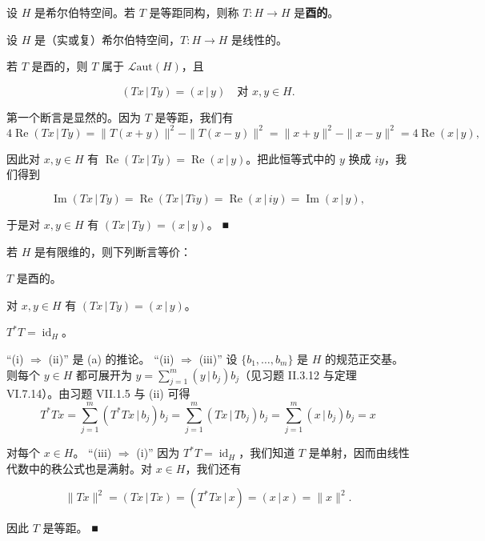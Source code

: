 设 $ H $ 是希尔伯特空间。若 $ T $ 是等距同构，则称 $ T: H \to H $ 是\textbf{酉的}。

\begin{remark}

设 $ H $ 是（实或复）希尔伯特空间，$ T: H \to H $ 是线性的。

\begin{items}
\item

若 $ T $ 是酉的，则 $ T $ 属于 $ \mathcal{L}\mathrm{aut}(H) $，且

\[
(Tx\,|\,Ty) = (x\,|\,y) \quad \text{对 } x, y \in H .
\]

\proofhead
第一个断言是显然的。因为 $ T $ 是等距，我们有
\[
4\operatorname{Re}(Tx\,|\,Ty) = \|T(x+y)\|^2 - \|T(x-y)\|^2 = \|x+y\|^2 - \|x-y\|^2 = 4\operatorname{Re}(x\,|\,y) ,
\]

因此对 $ x, y \in H $ 有 $ \operatorname{Re}(Tx\,|\,Ty) = \operatorname{Re}(x\,|\,y) $。把此恒等式中的 $ y $ 换成 $ iy $，我们得到

\[
\operatorname{Im}(Tx\,|\,Ty) = \operatorname{Re}(Tx\,|\,Tiy) = \operatorname{Re}(x\,|\,iy) = \operatorname{Im}(x\,|\,y) ,
\]

于是对 $ x, y \in H $ 有 $ (Tx\,|\,Ty) = (x\,|\,y) $。 \nobreak\hspace{0.35em}■

\item

若 $ H $ 是有限维的，则下列断言等价：

\end{items}

\begin{subitems}
\item

$ T $ 是酉的。

\item

对 $ x, y \in H $ 有 $ (Tx\,|\,Ty) = (x\,|\,y) $。

\item

$ T^*T = \operatorname{id}_H $。

\proofhead
“(i) $ \Rightarrow $ (ii)” 是 (a) 的推论。
“(ii) $ \Rightarrow $ (iii)” 设 $ \{b_1,\ldots,b_m\} $ 是 $ H $ 的规范正交基。则每个 $ y \in H $ 都可展开为 $ y = \sum_{j=1}^{m} (y\,|\,b_j)b_j $（见习题 II.3.12 与定理 VI.7.14）。由习题 VII.1.5 与 (ii) 可得
\[
T^*Tx = \sum_{j=1}^{m} (T^*Tx\,|\,b_j)b_j = \sum_{j=1}^{m} (Tx\,|\,Tb_j)b_j = \sum_{j=1}^{m} (x\,|\,b_j)b_j = x
\]

对每个 $ x \in H $。
“(iii) $ \Rightarrow $ (i)” 因为 $ T^*T = \operatorname{id}_H $，我们知道 $ T $ 是单射，因而由线性代数中的秩公式也是满射。对 $ x \in H $，我们还有

\[
\|Tx\|^2 = (Tx\,|\,Tx) = (T^*Tx\,|\,x) = (x\,|\,x) = \|x\|^2 .
\]

因此 $ T $ 是等距。 \nobreak\hspace{0.35em}■

\end{subitems}

\end{remark}

